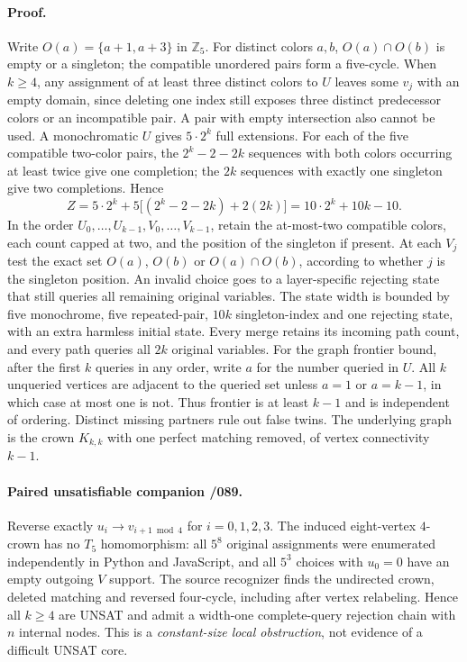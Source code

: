 \documentclass[11pt]{article}
\begin{document}
\paragraph{Proof.}
Write $O(a)=\{a+1,a+3\}$ in $\mathbb Z_5$.
For distinct colors $a,b$, $O(a)\cap O(b)$ is empty or a singleton; the compatible unordered pairs form a five-cycle.
When $k\ge4$, any assignment of at least three distinct colors to $U$ leaves some $v_j$ with an empty domain, since deleting one index still exposes three distinct predecessor colors or an incompatible pair. A pair with empty intersection also cannot be used. A monochromatic $U$ gives $5\cdot2^k$ full extensions. For each of the five compatible two-color pairs, the $2^k-2-2k$ sequences with both colors occurring at least twice give one completion; the $2k$ sequences with exactly one singleton give two completions. Hence
\[
Z=5\cdot2^k+
5\bigl[(2^k-2-2k)+2(2k)\bigr]
=10\cdot2^k+10k-10.
\]
In the order $U_0,\ldots,U_{k-1},V_0,\ldots,V_{k-1}$, retain the at-most-two compatible colors, each count capped at two, and the position of the singleton if present.
At each $V_j$ test the exact set $O(a)$, $O(b)$ or $O(a)\cap O(b)$, according to whether $j$ is the singleton position.
An invalid choice goes to a layer-specific rejecting state that still queries all remaining original variables.
The state width is bounded by five monochrome, five repeated-pair, $10k$ singleton-index and one rejecting state, with an extra harmless initial state.
Every merge retains its incoming path count, and every path queries all $2k$ original variables.
For the graph frontier bound, after the first $k$ queries in any order, write $a$ for the number queried in $U$. All $k$ unqueried vertices are adjacent to the queried set unless $a=1$ or $a=k-1$, in which case at most one is not. Thus frontier is at least $k-1$ and is independent of ordering. Distinct missing partners rule out false twins. The underlying graph is the crown $K_{k,k}$ with one perfect matching removed, of vertex connectivity $k-1$.

\paragraph{Paired unsatisfiable companion /089.}
Reverse exactly $u_i\to v_{i+1\bmod4}$ for $i=0,1,2,3$.
The induced eight-vertex $4$-crown has no $T_5$ homomorphism: all $5^8$ original assignments were enumerated independently in Python and JavaScript, and all $5^3$ choices with $u_0=0$ have an empty outgoing $V$ support.
The source recognizer finds the undirected crown, deleted matching and reversed four-cycle, including after vertex relabeling. Hence all $k\ge4$ are UNSAT and admit a width-one complete-query rejection chain with $n$ internal nodes. This is a \emph{constant-size local obstruction}, not evidence of a difficult UNSAT core.
\end{document}
